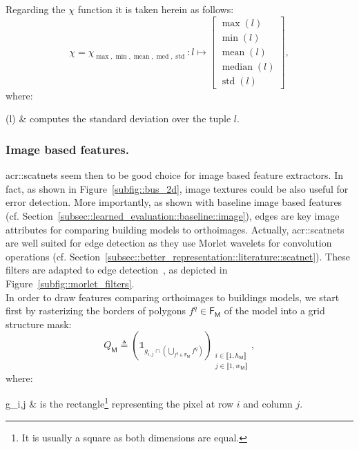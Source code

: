            Regarding the \(\chi\) function it is taken herein as follows:
            \begin{equation}
                \label{eq::max_min_mean_med_std_extractor}
                \chi = \chi_{\max,\min,\operatorname{mean},\operatorname{med},\operatorname{std}}: l \mapsto \begin{bmatrix}
                    \max(l)\\
                    \min(l)\\
                    \operatorname{mean}(l)\\
                    \operatorname{median}(l)\\
                    \operatorname{std}(l)
                \end{bmatrix},
            \end{equation}
            where:
            \begin{conditions}
                (l) & computes the standard deviation over the tuple \(l\).
            \end{conditions}

        \subsubsection{Image based features.}
            \glspl{acr::scatnet} seem then to be good choice for image based feature extractors.
            In fact, as shown in Figure~\ref{subfig::bus_2d}, image textures could be also useful for error detection.
            More importantly, as shown with baseline image based features (cf. Section~\ref{subsec::learned_evaluation::baseline::image}), edges are key image attributes for comparing building models to orthoimages.
            Actually, \glspl{acr::scatnet} are well suited for edge detection as they use Morlet wavelets for convolution operations (cf. Section~\ref{subsec::better_representation::literature::scatnet}).
            These filters are adapted to edge detection~\parencite{zhang2007radon}, as depicted in Figure~\ref{subfig::morlet_filters}.\\

            In order to draw features comparing orthoimages to buildings models, we start first by rasterizing the borders of polygons \(f^q \in \mathsf{F_M}\) of the model into a grid structure mask:
            \begin{equation}
                \label{eq::borders_mask}
                Q_{\mathsf{M}} \triangleq \left(\mathbb{1}_{g_{i,j} \cap \left(\bigcup_{f^q \in \mathsf{F_M}}f^q\right)}\right)_{\substack{i \in \llbracket 1, h_\mathsf{M} \rrbracket\\j \in \llbracket 1, w_\mathsf{M} \rrbracket}},
            \end{equation}
            where:
            \begin{conditions}
                g_{i,j} & is the rectangle\footnote{It is usually a square as both dimensions are equal.} representing the pixel at row \(i\) and column \(j\).
            \end{conditions}

